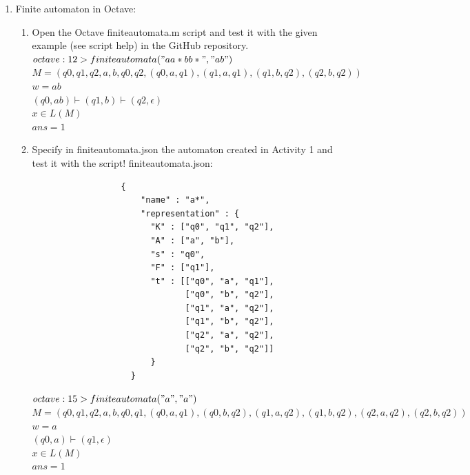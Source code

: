 \documentclass{article}
\begin{document}
\begin{enumerate}
    \item Finite automaton in Octave:
          \begin{enumerate}
              \item Open the Octave finiteautomata.m script and test it with the given example (see script help) in the GitHub repository.\\
                        $octave:12> finiteautomata("aa*bb*", "ab")$\\
                        $M = ({q0, q1, q2}, {a, b}, q0, {q2}, {(q0, a, q1), (q1, a, q1), (q1, b, q2), (q2, b, q2)})$\\
                        $w = ab$\\
                        $(q0, ab) \vdash (q1, b) \vdash (q2, \epsilon)$\\
                        $x \in L(M)$\\
                        $ans = 1$\\
              \item Specify in finiteautomata.json the automaton created in Activity 1 and test it with the script!
                    finiteautomata.json:
                    \begin{verbatim}
                  {
                      "name" : "a*",
                      "representation" : {
                        "K" : ["q0", "q1", "q2"],
                        "A" : ["a", "b"],
                        "s" : "q0",
                        "F" : ["q1"],
                        "t" : [["q0", "a", "q1"],
                               ["q0", "b", "q2"],
                               ["q1", "a", "q2"],
                               ["q1", "b", "q2"],
                               ["q2", "a", "q2"],
                               ["q2", "b", "q2"]]
                        }
                    }
              \end{verbatim}
                $octave:15> finiteautomata("a","a")$\\
                $M = ({q0, q1, q2}, {a, b}, q0, {q1}, {(q0, a, q1), (q0, b, q2), (q1, a, q2), (q1, b, q2), (q2, a, q2), (q2, b, q2)})$\\
                $w = a$\\
                $(q0, a) \vdash (q1, \epsilon)$\\
                $x \in L(M)$\\
                $ans = 1$
          \end{enumerate}

\end{enumerate}
\pagebreak
\end{document}
